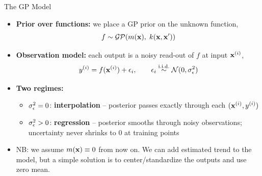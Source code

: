 \documentclass[main]{subfiles}
\begin{document}
\begin{frame}[t]{The GP Model}
  \small
  \begin{itemize}
    \item \textbf{Prior over functions:} we place a GP prior on the unknown function,
      $$f \sim \mathcal{GP}(m(\mathbf{x}),\; k(\mathbf{x},\mathbf{x}'))$$
    \item \textbf{Observation model:} each output is a noisy read-out of $f$ at input $\mathbf{x}^{(i)}$,
      $$y^{(i)} = f(\mathbf{x}^{(i)}) + \epsilon_i, \qquad \epsilon_i \overset{\text{i.i.d.}}{\sim} \mathcal{N}(0, \sigma_\epsilon^2)$$
    \item \textbf{Two regimes:}
      \begin{itemize}
        \item $\sigma_\epsilon^2 = 0$: \textbf{interpolation} -- posterior passes exactly through each $(\mathbf{x}^{(i)}, y^{(i)})$
        \item $\sigma_\epsilon^2 > 0$: \textbf{regression} -- posterior smooths through noisy observations; uncertainty never shrinks to $0$ at training points
      \end{itemize}
      \item NB: we assume $m(\mathbf{x}) \equiv 0$ from now on.
      We can add estimated trend to the model, but a simple solution is to center/standardize the outputs and use zero mean.
  \end{itemize}
\end{frame}
\end{document}
